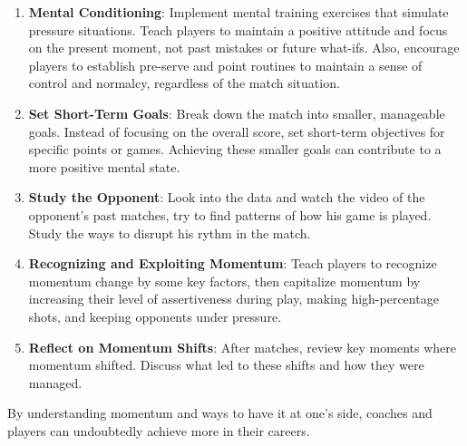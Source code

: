 \begin{enumerate}
    \item \textbf{Mental Conditioning}: Implement mental training exercises that simulate pressure situations. Teach players to maintain a positive attitude and focus on the present moment, not past mistakes or future what-ifs. Also, encourage players to establish pre-serve and point routines to maintain a sense of control and normalcy, regardless of the match situation.
    \item \textbf{Set Short-Term Goals}: Break down the match into smaller, manageable goals. Instead of focusing on the overall score, set short-term objectives for specific points or games. Achieving these smaller goals can contribute to a more positive mental state.
    \item \textbf{Study the Opponent}: Look into the data and watch the video of the opponent's past matches, try to find patterns of how his game is played. Study the ways to disrupt his rythm in the match.
    \item \textbf{Recognizing and Exploiting Momentum}: Teach players to recognize momentum change by some key factors, then capitalize momentum by increasing their level of assertiveness during play, making high-percentage shots, and keeping opponents under pressure.
    \item \textbf{Reflect on Momentum Shifts}: After matches, review key moments where momentum shifted. Discuss what led to these shifts and how they were managed.
\end{enumerate}

By understanding momentum and ways to have it at one's side, coaches and players can undoubtedly achieve more in their careers.